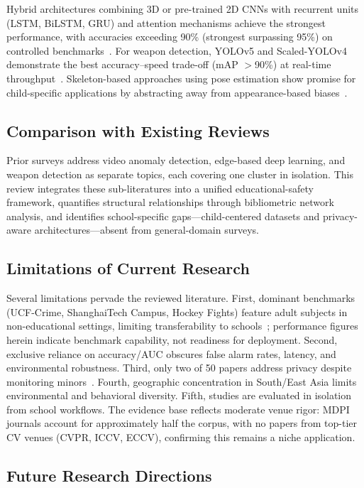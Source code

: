 \documentclass[conference]{IEEEtran}
\begin{document}
Hybrid architectures combining 3D or pre-trained 2D CNNs with recurrent units (LSTM, BiLSTM, GRU) and attention mechanisms achieve the strongest performance, with accuracies exceeding 90\% (strongest surpassing 95\%) on controlled benchmarks~\cite{b17,b18,b2}. For weapon detection, YOLOv5 and Scaled-YOLOv4 demonstrate the best accuracy--speed trade-off (mAP $>$90\%) at real-time throughput~\cite{b19,b9}. Skeleton-based approaches using pose estimation show promise for child-specific applications by abstracting away from appearance-based biases~\cite{b16,b20}.

\subsection{Comparison with Existing Reviews}

Prior surveys address video anomaly detection, edge-based deep learning, and weapon detection as separate topics, each covering one cluster in isolation. This review integrates these sub-literatures into a unified educational-safety framework, quantifies structural relationships through bibliometric network analysis, and identifies school-specific gaps---child-centered datasets and privacy-aware architectures---absent from general-domain surveys.

\subsection{Limitations of Current Research}

Several limitations pervade the reviewed literature. First, dominant benchmarks (UCF-Crime, ShanghaiTech Campus, Hockey Fights) feature adult subjects in non-educational settings, limiting transferability to schools~\cite{b15}; performance figures herein indicate benchmark capability, not readiness for deployment. Second, exclusive reliance on accuracy/AUC obscures false alarm rates, latency, and environmental robustness. Third, only two of 50 papers address privacy despite monitoring minors~\cite{b11}. Fourth, geographic concentration in South/East Asia limits environmental and behavioral diversity. Fifth, studies are evaluated in isolation from school workflows. The evidence base reflects moderate venue rigor: MDPI journals account for approximately half the corpus, with no papers from top-tier CV venues (CVPR, ICCV, ECCV), confirming this remains a niche application.

\subsection{Future Research Directions}
\end{document}
